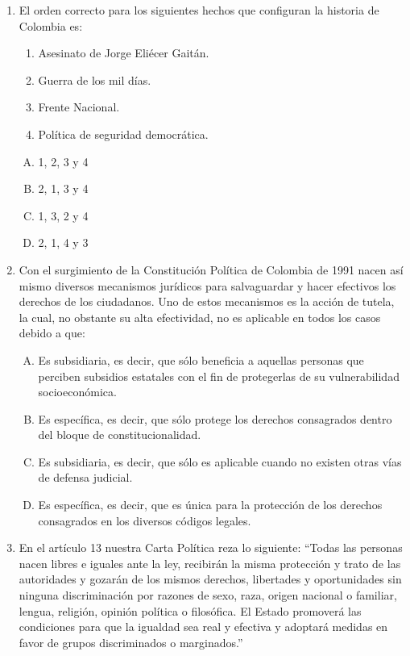 \begin{enumerate}
\item El  orden correcto para los siguientes hechos que configuran la historia de Colombia es:\label{socandres-17}

\begin{enumerate}[1.]
\item Asesinato de Jorge Eliécer Gaitán.
\item Guerra de los mil días.
\item Frente Nacional.
\item Política de seguridad democrática.
\end{enumerate}
\begin{enumerate}[(A)]
\item 1, 2, 3 y 4
\item 2, 1, 3 y 4
\item 1, 3, 2 y 4
\item 2, 1, 4 y 3
\end{enumerate}
\item Con el surgimiento de la Constitución Política de Colombia de 1991 nacen así mismo diversos mecanismos jurídicos para salvaguardar y hacer efectivos los derechos de los ciudadanos. Uno de estos mecanismos es la acción de tutela, la cual, no obstante su alta efectividad, no es aplicable en todos los casos debido a que:\label{socandres-18}

\begin{enumerate}[(A)]
\item Es subsidiaria, es decir, que sólo beneficia a aquellas personas que perciben subsidios estatales con el fin de protegerlas de su vulnerabilidad socioeconómica. 
\item Es específica, es decir, que sólo protege los derechos consagrados dentro del bloque de constitucionalidad.
\item Es subsidiaria, es decir, que sólo es aplicable cuando no existen otras vías de defensa judicial.
\item Es específica, es decir, que es única para la protección de los derechos consagrados en los diversos códigos legales.

\end{enumerate}

\newpage
\item En el artículo 13 nuestra Carta Política reza lo siguiente: “Todas las personas nacen libres e iguales ante la ley, recibirán la misma protección y trato de las autoridades y gozarán de los mismos derechos, libertades y oportunidades sin ninguna discriminación por razones de sexo, raza, origen nacional o familiar, lengua, religión, opinión política o filosófica.
El Estado promoverá las condiciones para que la igualdad sea real y efectiva y adoptará medidas en favor de grupos discriminados o marginados.”\label{socandres-19}


\end{enumerate}
